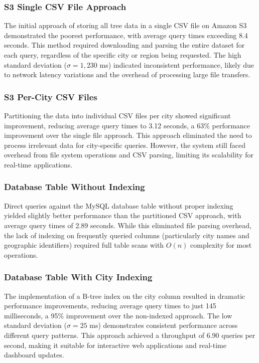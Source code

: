 \subsubsection{S3 Single CSV File Approach}

The initial approach of storing all tree data in a single CSV file on Amazon S3 demonstrated the poorest performance, with average query times exceeding 8.4 seconds. This method required downloading and parsing the entire dataset for each query, regardless of the specific city or region being requested. The high standard deviation ($\sigma = 1,230$ ms) indicated inconsistent performance, likely due to network latency variations and the overhead of processing large file transfers.

\subsubsection{S3 Per-City CSV Files}

Partitioning the data into individual CSV files per city showed significant improvement, reducing average query times to 3.12 seconds, a 63\% performance improvement over the single file approach. This approach eliminated the need to process irrelevant data for city-specific queries. However, the system still faced overhead from file system operations and CSV parsing, limiting its scalability for real-time applications.

\subsubsection{Database Table Without Indexing}

Direct queries against the MySQL database table without proper indexing yielded slightly better performance than the partitioned CSV approach, with average query times of 2.89 seconds. While this eliminated file parsing overhead, the lack of indexing on frequently queried columns (particularly city names and geographic identifiers) required full table scans with $O(n)$ complexity for most operations.

\subsubsection{Database Table With City Indexing}

The implementation of a B-tree index on the city column resulted in dramatic performance improvements, reducing average query times to just 145 milliseconds, a 95\% improvement over the non-indexed approach. The low standard deviation ($\sigma = 25$ ms) demonstrates consistent performance across different query patterns. This approach achieved a throughput of 6.90 queries per second, making it suitable for interactive web applications and real-time dashboard updates.

